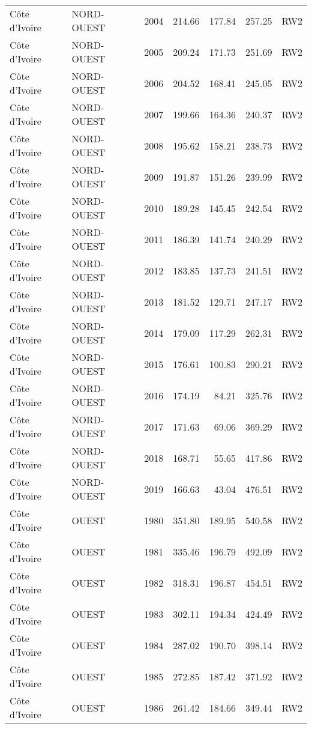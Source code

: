 \begin{longtable}{lllrrrl}
  C\^{o}te d'Ivoire & NORD-OUEST & 2004 & 214.66 & 177.84 & 257.25 & RW2 \\ 
  C\^{o}te d'Ivoire & NORD-OUEST & 2005 & 209.24 & 171.73 & 251.69 & RW2 \\ 
  C\^{o}te d'Ivoire & NORD-OUEST & 2006 & 204.52 & 168.41 & 245.05 & RW2 \\ 
  C\^{o}te d'Ivoire & NORD-OUEST & 2007 & 199.66 & 164.36 & 240.37 & RW2 \\ 
  C\^{o}te d'Ivoire & NORD-OUEST & 2008 & 195.62 & 158.21 & 238.73 & RW2 \\ 
  C\^{o}te d'Ivoire & NORD-OUEST & 2009 & 191.87 & 151.26 & 239.99 & RW2 \\ 
  C\^{o}te d'Ivoire & NORD-OUEST & 2010 & 189.28 & 145.45 & 242.54 & RW2 \\ 
  C\^{o}te d'Ivoire & NORD-OUEST & 2011 & 186.39 & 141.74 & 240.29 & RW2 \\ 
  C\^{o}te d'Ivoire & NORD-OUEST & 2012 & 183.85 & 137.73 & 241.51 & RW2 \\ 
  C\^{o}te d'Ivoire & NORD-OUEST & 2013 & 181.52 & 129.71 & 247.17 & RW2 \\ 
  C\^{o}te d'Ivoire & NORD-OUEST & 2014 & 179.09 & 117.29 & 262.31 & RW2 \\ 
  C\^{o}te d'Ivoire & NORD-OUEST & 2015 & 176.61 & 100.83 & 290.21 & RW2 \\ 
  C\^{o}te d'Ivoire & NORD-OUEST & 2016 & 174.19 & 84.21 & 325.76 & RW2 \\ 
  C\^{o}te d'Ivoire & NORD-OUEST & 2017 & 171.63 & 69.06 & 369.29 & RW2 \\ 
  C\^{o}te d'Ivoire & NORD-OUEST & 2018 & 168.71 & 55.65 & 417.86 & RW2 \\ 
  C\^{o}te d'Ivoire & NORD-OUEST & 2019 & 166.63 & 43.04 & 476.51 & RW2 \\ 
  C\^{o}te d'Ivoire & OUEST & 1980 & 351.80 & 189.95 & 540.58 & RW2 \\ 
  C\^{o}te d'Ivoire & OUEST & 1981 & 335.46 & 196.79 & 492.09 & RW2 \\ 
  C\^{o}te d'Ivoire & OUEST & 1982 & 318.31 & 196.87 & 454.51 & RW2 \\ 
  C\^{o}te d'Ivoire & OUEST & 1983 & 302.11 & 194.34 & 424.49 & RW2 \\ 
  C\^{o}te d'Ivoire & OUEST & 1984 & 287.02 & 190.70 & 398.14 & RW2 \\ 
  C\^{o}te d'Ivoire & OUEST & 1985 & 272.85 & 187.42 & 371.92 & RW2 \\ 
  C\^{o}te d'Ivoire & OUEST & 1986 & 261.42 & 184.66 & 349.44 & RW2 \\ 

\end{longtable}
